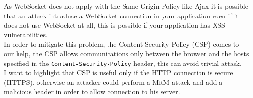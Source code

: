 	As WebSocket does not apply with the Same-Origin-Policy like Ajax it is possible that an attack introduce a WebSocket connection in your application even if it
	does not use WebSocket at all, this is possible if your application has XSS vulnerabilities.\\
	In order to mitigate this problem, the Content-Security-Policy (CSP) comes to our help, the CSP allows communications only between the browser and the hosts specified in the
	\texttt{Content-Security-Policy} header, this can avoid trivial attack.\\
	I want to highlight that CSP is useful only if the HTTP connection is secure (HTTPS), otherwise an attacker could perform a MitM attack and add a malicious header in order to allow
	connection to his server.\\
	